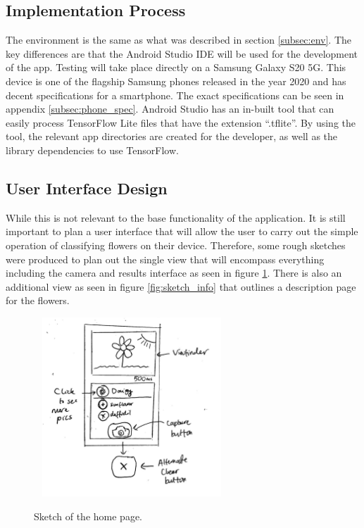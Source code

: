 \documentclass[12pt,a4paper]{report}
\begin{document}
\subsection{Implementation Process}

The environment is the same as what was described in section \ref{subsec:env}. The key differences are that the Android 
Studio IDE will be used for the development of the app. Testing will take place directly on a Samsung Galaxy S20 5G. 
This device is one of the flagship Samsung phones released in the year 2020 and has decent specifications for a 
smartphone. The exact specifications can be seen in appendix \ref{subsec:phone_spec}. Android Studio has an in-built 
tool that can easily process TensorFlow Lite files that have the extension “.tflite”. By using the tool, the relevant 
app directories are created for the developer, as well as the library dependencies to use TensorFlow.

\subsection{User Interface Design}

While this is not relevant to the base functionality of the application. It is still important to plan a user interface 
that will allow the user to carry out the simple operation of classifying flowers on their device. Therefore, some rough
sketches were produced to plan out the single view that will encompass everything including the camera and results interface as 
seen in figure \ref{fig:sketch_main}. There is also an additional view as seen in figure \ref{fig:sketch_info} that outlines a description page for the 
flowers.

\begin{figure}[h]\
    \centering
    \includegraphics[width=0.6\textwidth]{Main_Sketch.jpg}
    \caption{Sketch of the home page.}
    \label{fig:sketch_main}
\end{figure}
\end{document}
